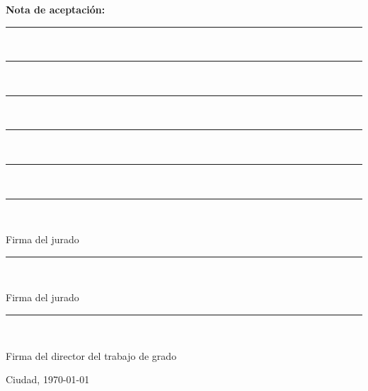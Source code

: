  \noindent
\begin{minipage}[t]{0.3\textwidth}
\textbf{Nota de aceptación:}

\end{minipage}
\hfill
\begin{minipage}[t]{0.6\textwidth}

\vspace{0.8cm}
\rule{\textwidth}{0.4pt}\\[0.5cm]
\rule{\textwidth}{0.4pt}\\[0.5cm]
\rule{\textwidth}{0.4pt}\\[0.5cm]
\rule{\textwidth}{0.4pt}\\[0.5cm]
\rule{\textwidth}{0.4pt}\\[2cm]
\rule{0.9\textwidth}{0.4pt}\\
\raggedright Firma del jurado

\vspace{1.2cm}
\rule{0.9\textwidth}{0.4pt}\\
\raggedright Firma del jurado

\vspace{1.2cm}
\rule{0.9\textwidth}{0.4pt}\\
\raggedright Firma del director del trabajo de grado
\end{minipage}

\vspace{2cm}
\vfill
Ciudad, \today